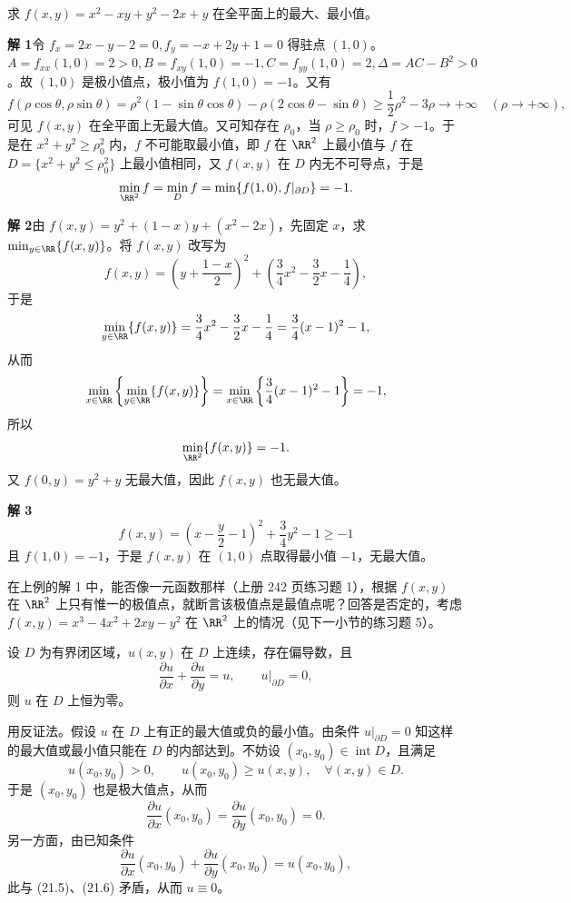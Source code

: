 \begin{xexample}[21.3.7]
求 $f(x,y)=x^2-xy+y^2-2x+y$ 在全平面上的最大、最小值。
\end{xexample}
\begin{xsolution}
\textbf{解 1}\quad 令 $f_x=2x-y-2=0,f_y=-x+2y+1=0$ 得驻点 $(1,0)$。$A=f_{xx}(1,0)=2>0,B=f_{xy}(1,0)=-1,C=f_{yy}(1,0)=2,\Delta=AC-B^2>0$。故 $(1,0)$ 是极小值点，极小值为 $f(1,0)=-1$。又有
\[
  f(\rho\cos\theta,\rho\sin\theta)
  =\rho^2(1-\sin\theta\cos\theta)-\rho(2\cos\theta-\sin\theta)
  \ge\frac12\rho^2-3\rho\to+\infty\quad(\rho\to+\infty),
\]
可见 $f(x,y)$ 在全平面上无最大值。又可知存在 $\rho_0$，当 $\rho\ge\rho_0$ 时，$f>-1$。于是在 $x^2+y^2\ge\rho_0^2$ 内，$f$ 不可能取最小值，即 $f$ 在 $\RR^2$ 上最小值与 $f$ 在 $D=\{x^2+y^2\le\rho_0^2\}$ 上最小值相同，又 $f(x,y)$ 在 $D$ 内无不可导点，于是
\[
  \min_{\RR^2}f=\min_D f=\min\{f(1,0),f|_{\partial D}\}=-1.
\]

\textbf{解 2}\quad 由 $f(x,y)=y^2+(1-x)y+(x^2-2x)$，先固定 $x$，求 $\min_{y\in\RR}\{f(x,y)\}$。将 $f(x,y)$ 改写为
\[
  f(x,y)=\left(y+\frac{1-x}{2}\right)^2+\left(\frac34x^2-\frac32x-\frac14\right),
\]
于是
\[
  \min_{y\in\RR}\{f(x,y)\}=\frac34x^2-\frac32x-\frac14
  =\frac34(x-1)^2-1,
\]
从而
\[
  \min_{x\in\RR}\left\{\min_{y\in\RR}\{f(x,y)\}\right\}
  =\min_{x\in\RR}\left\{\frac34(x-1)^2-1\right\}=-1,
\]
所以
\[
  \min_{\RR^2}\{f(x,y)\}=-1.
\]
又 $f(0,y)=y^2+y$ 无最大值，因此 $f(x,y)$ 也无最大值。

\textbf{解 3}\quad
\[
  f(x,y)=\left(x-\frac y2-1\right)^2+\frac34y^2-1\ge-1
\]
且 $f(1,0)=-1$，于是 $f(x,y)$ 在 $(1,0)$ 点取得最小值 $-1$，无最大值。
\end{xsolution}
\begin{xremark}
在上例的解 1 中，能否像一元函数那样（上册 242 页练习题 1），根据 $f(x,y)$ 在 $\RR^2$ 上只有惟一的极值点，就断言该极值点是最值点呢？回答是否定的，考虑 $f(x,y)=x^3-4x^2+2xy-y^2$ 在 $\RR^2$ 上的情况（见下一小节的练习题 5）。
\end{xremark}
\begin{xexample}[21.3.8]
设 $D$ 为有界闭区域，$u(x,y)$ 在 $D$ 上连续，存在偏导数，且
\[
  \frac{\partial u}{\partial x}+\frac{\partial u}{\partial y}=u,
  \qquad u|_{\partial D}=0,
\]
则 $u$ 在 $D$ 上恒为零。
\end{xexample}
\begin{xproof}
用反证法。假设 $u$ 在 $D$ 上有正的最大值或负的最小值。由条件 $u|_{\partial D}=0$ 知这样的最大值或最小值只能在 $D$ 的内部达到。不妨设 $(x_0,y_0)\in\operatorname{int}D$，且满足
\begin{equation}
  u(x_0,y_0)>0,\qquad u(x_0,y_0)\ge u(x,y),\quad\forall(x,y)\in D.
  \tag{21.5}
  \label{eq:21.5}
\end{equation}
于是 $(x_0,y_0)$ 也是极大值点，从而
\begin{equation}
  \frac{\partial u}{\partial x}(x_0,y_0)
  =\frac{\partial u}{\partial y}(x_0,y_0)=0.
  \tag{21.6}
  \label{eq:21.6}
\end{equation}
另一方面，由已知条件
\[
  \frac{\partial u}{\partial x}(x_0,y_0)
  +\frac{\partial u}{\partial y}(x_0,y_0)=u(x_0,y_0),
\]
此与 (21.5)、(21.6) 矛盾，从而 $u\equiv0$。
\end{xproof}

